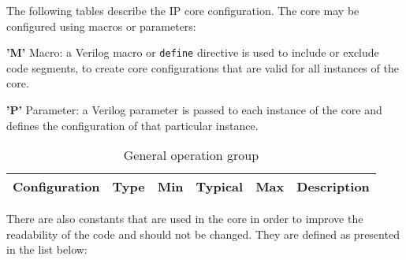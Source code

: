 
The following tables describe the IP core configuration. The core may be configured using macros or parameters:

\begin{description}
    \item \textbf{'M'} Macro: a Verilog macro or \texttt{define} directive is used to include or exclude code segments, to create core configurations that are valid for all instances of the core.
    \item \textbf{'P'} Parameter: a Verilog parameter is passed to each instance of the core and defines the configuration of that particular instance.
\end{description}

\begin{table}[H]
  \centering
  \begin{tabularx}{\textwidth}{|l|c|c|c|c|X|}

    \hline
    \rowcolor{iob-green}
    {\bf Configuration} & {\bf Type} & {\bf Min} & {\bf Typical} & {\bf Max} & {\bf Description} \\ \hline \hline

    

  \end{tabularx}
  \caption{General operation group}
  \label{general_operation_confs_tab:is}
\end{table}

There are also constants that are used in the core in order to improve the readability
of the code and should not be changed. They are defined as presented in the list below:

\clearpage